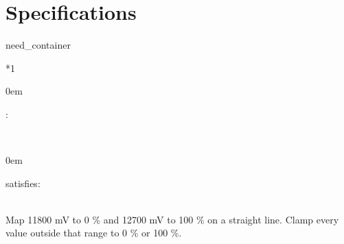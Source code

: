 \documentclass[a4paper,10pt,english]{sphinxmanual}
\begin{document}
\chapter{Specifications}
\label{\detokenize{requirements/specifications:specifications}}\label{\detokenize{requirements/specifications::doc}}
\begin{sphinxuseclass}{need_container}

\begin{savenotes}\sphinxattablestart
\sphinxthistablewithglobalstyle
\centering
{}\label{\detokenize{requirements/specifications:SPEC_SOC_LINEAR}}\nobreak
\begin{tabular}[t]{*{1}{}}
\sphinxtoprule
\sphinxtableatstartofbodyhook
\begin{DUlineblock}{0em}
\item[] :  
\end{DUlineblock}
\\
\sphinxhline
\begin{DUlineblock}{0em}
\item[] 
\item[] 
\item[] 
\item[] 
\item[] 
\item[] 
\item[] \item[] satisfies: 

\end{DUlineblock}
\\
\sphinxhline
\sphinxAtStartPar
Map 11800 mV to 0 \% and 12700 mV to 100 \% on a straight line.
Clamp every value outside that range to 0 \% or 100 \%.
\\
\sphinxbottomrule
\end{tabular}
\sphinxtableafterendhook\par
\sphinxattableend\end{savenotes}

\end{sphinxuseclass}
\end{document}
